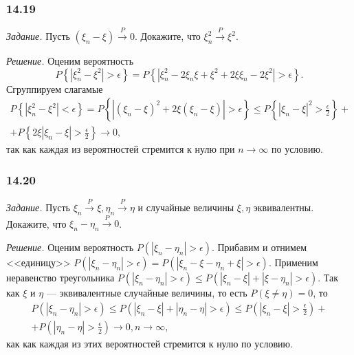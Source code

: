 \subsubsection*{14.19}

\textit{Задание.} Пусть $ \left( \xi_n - \xi \right) \overset{P}{ \rightarrow } 0$.
Докажите, что $ \xi_n^2 \overset{P}{ \rightarrow } \xi^2$.

\textit{Решение.} Оценим вероятность
$$P \left\{ \left| \xi_n^2 - \xi^2 \right| > \epsilon \right\} =
P \left\{ \left| \xi_n^2 - 2 \xi_n \xi + \xi^2 + 2 \xi \xi_n - 2 \xi^2 \right| > \epsilon \right\}.$$
Сгруппируем слагамые
\begin{equation*}
\begin{split}
P \left\{ \left| \xi_n^2 - \xi^2 \right| < \epsilon \right\} =
P \left\{ \left| \left( \xi_n - \xi \right)^2 + 2 \xi \left( \xi_n - \xi \right) \right| > \epsilon \right\} \leq
P \left\{ \left| \xi_n - \xi \right|^2 > \frac{ \epsilon }{2} \right\} + \\
+ P \left\{ 2 \xi \left| \xi_n - \xi \right| > \frac{ \epsilon }{2} \right\} \rightarrow
0,
\end{split}
\end{equation*}
так как каждая из вероятностей стремится к нулю при $n \rightarrow \infty $ по условию.

\subsubsection*{14.20}

\textit{Задание.} Пусть $ \xi_n \overset{P}{ \rightarrow } \xi, \eta_n \overset{P}{ \rightarrow } \eta $ и случайные величины $ \xi, \eta $ эквивалентны.
Докажите, что $ \xi_n - \eta_n \overset{P}{ \rightarrow } 0$. 

\textit{Решение.} Оценим вероятность $P \left( \left| \xi_n - \eta_n \right| > \epsilon \right) $.
Прибавим и отнимем <<единицу>> $P \left( \left| \xi_n - \eta_n \right| > \epsilon \right) = P \left( \left| \xi_n - \xi - \eta_n + \xi \right| > \epsilon \right) $.
Применим неравенство треугольника
$P \left( \left| \xi_n - \eta_n \right| > \epsilon \right) \leq
P \left( \left| \xi_n - \xi \right| + \left| \xi - \eta_n \right| > \epsilon \right) $.
Так как $ \xi $ и $ \eta $ --- эквивалентные случайные величины, то есть $P \left( \xi \neq \eta \right) = 0$,
то
\begin{equation*}
\begin{split}
P \left( \left| \xi_n - \eta_n \right| > \epsilon \right) \leq
P \left( \left| \xi_n - \xi \right| + \left| \eta_n - \eta \right| > \epsilon \right) \leq
P \left( \left| \xi_n - \xi \right| > \frac{ \epsilon }{2} \right) + \\
+ P \left( \left| \eta_n - \eta \right| > \frac{ \epsilon }{2} \right) \rightarrow
0, n \rightarrow \infty,
\end{split}
\end{equation*}
как как каждая из этих вероятностей стремится к нулю по условию.


